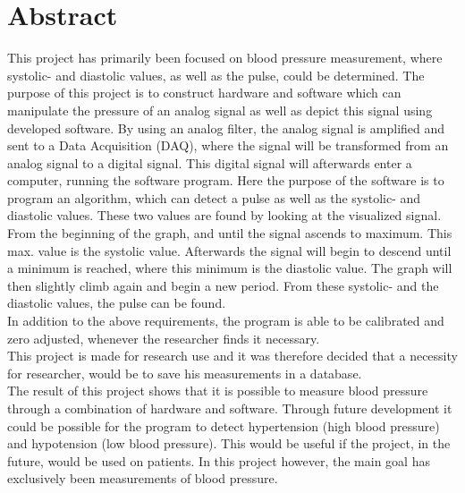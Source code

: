 \chapter{Abstract} 
This project has primarily been focused on blood pressure measurement, where systolic- and diastolic values, as well as the pulse, could be determined. The purpose of this project is to construct hardware and software which can manipulate the pressure of an analog signal as well as depict this signal using developed software. By using an analog filter, the analog signal is amplified and sent to a Data Acquisition (DAQ), where the signal will be transformed from an analog signal to a digital signal. This digital signal will afterwards enter a computer, running the software program. Here the purpose of the software is to program an algorithm, which can detect a pulse as well as the systolic- and diastolic values. These two values are found by looking at the visualized signal.  From the beginning of the graph, and until the signal ascends to maximum. This max. value is the systolic value. Afterwards the signal will begin to descend until a minimum is reached, where this minimum is the diastolic value. The graph will then slightly climb again and begin a new period. From these systolic- and the diastolic values, the pulse can be found.\\
In addition to the above requirements, the program is able to be calibrated and zero adjusted, whenever the researcher finds it necessary. \\
This project is made for research use and it was therefore decided that a necessity for researcher, would be to save his measurements in a database. \\
The result of this project shows that it is possible to measure blood pressure through a combination of hardware and software. Through future development it could be possible for the program to detect hypertension (high blood pressure) and hypotension (low blood pressure). This would be useful if the project, in the future, would be used on patients. In this project however, the main goal has exclusively been measurements of blood pressure. 

